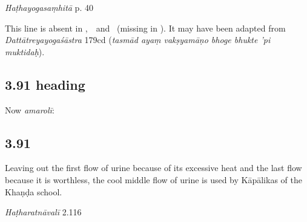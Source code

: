 \begin{ekdosis}

\begin{testimonia}[hp03_090_1]
\emph{Haṭhayogasaṃhitā} p. 40
\begin{versinnote}
\end{versinnote}
\end{testimonia}

\begin{philcomm}[hp03_090_1]
This line is absent in \alphaTwo,\ \alphaThree\ and \gammaOne\ (missing in \alphaOne). It may have been adapted from \emph{Dattātreyayogaśāstra} 179cd (\emph{tasmād ayaṃ vakṣyamāṇo bhoge bhukte ’pi muktidaḥ}). 
\end{philcomm}


\subsection*{3.91 heading}
\begin{translation}[hp03_091a]
Now \emph{amarolī}:
\end{translation}


\subsection*{3.91}
\begin{translation}[hp03_091]
Leaving out the first flow of urine because of its excessive heat and the last flow because it is worthless, the cool middle flow of urine is used by Kāpālikas of the Khaṇḍa school.
\end{translation}

\begin{sources}[hp03_091]
\end{sources}

\begin{testimonia}[hp03_091]
\emph{Haṭharatnāvalī} 2.116
\begin{versinnote}
\tl{\var{vihāya nityāṃ ] pittolbaṇatvāt \vl}\\+}
\tl{\var{anarghyām ] anarghyā}\\!}
\end{versinnote}


\end{testimonia}
\end{ekdosis}
